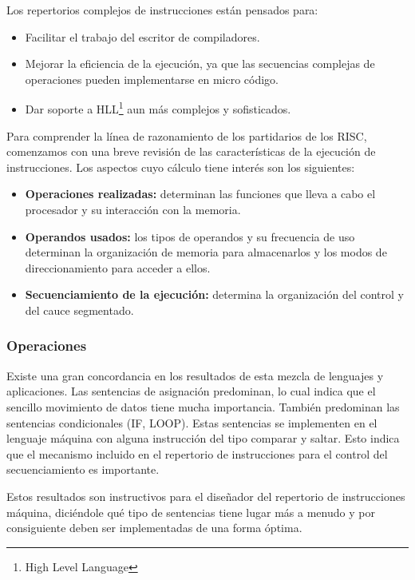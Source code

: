 Los repertorios complejos de instrucciones están pensados para:

\begin{itemize}
  \item Facilitar el trabajo del escritor de compiladores.
  \item Mejorar la eficiencia de la ejecución, ya que las secuencias complejas de operaciones pueden implementarse en micro código.
  \item Dar soporte a HLL\footnote{High Level Language} aun más complejos y sofisticados.
\end{itemize}

Para comprender la línea de razonamiento de los partidarios de los RISC, comenzamos con una breve revisión de las características de la ejecución de instrucciones. Los aspectos cuyo cálculo tiene interés son los siguientes:

\begin{itemize}
  \item \textbf{Operaciones realizadas:} determinan las funciones que lleva a cabo el procesador y su interacción con la memoria.
  \item \textbf{Operandos usados:} los tipos de operandos y su frecuencia de uso determinan la organización de memoria para almacenarlos y los modos de direccionamiento para acceder a ellos.
  \item \textbf{Secuenciamiento de la ejecución:} determina la organización del control y del cauce segmentado.
\end{itemize}

\subsubsection*{Operaciones}

Existe una gran concordancia en los resultados de esta mezcla de lenguajes y aplicaciones. Las sentencias de asignación predominan, lo cual indica que el sencillo movimiento de datos tiene mucha importancia. También predominan las sentencias condicionales (IF, LOOP). Estas sentencias se implementen en el lenguaje máquina con alguna instrucción del tipo comparar y saltar. Esto indica que el mecanismo incluido en el repertorio de instrucciones para el control del secuenciamiento es importante.

Estos resultados son instructivos para el diseñador del repertorio de instrucciones máquina, diciéndole qué tipo de sentencias tiene lugar más a menudo y por consiguiente deben ser implementadas de una forma óptima.

